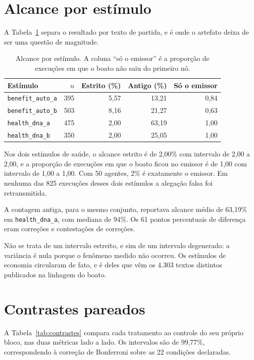 \section{Alcance por estímulo}

A Tabela~\ref{tab:estimulos} separa o resultado por texto de partida, e é onde
o artefato deixa de ser uma questão de magnitude.

\begin{table}[htbp]
\centering
\caption{Alcance por estímulo. A coluna ``só o emissor'' é a proporção de
execuções em que o boato não saiu do primeiro nó.}
\label{tab:estimulos}
\begin{tabular}{lrrrr}
\toprule
Estímulo & $n$ & Estrito (\%) & Antigo (\%) & Só o emissor \\
\midrule
\texttt{benefit\_auto\_a} & 395 & 5,57 & 13,21 & 0,84 \\
\texttt{benefit\_auto\_b} & 503 & 8,16 & 21,27 & 0,63 \\
\texttt{health\_dna\_a}   & 475 & 2,00 & 63,19 & 1,00 \\
\texttt{health\_dna\_b}   & 350 & 2,00 & 25,05 & 1,00 \\
\bottomrule
\end{tabular}
\end{table}

Nos dois estímulos de saúde, o alcance estrito é de 2,00\% com intervalo de
2,00 a 2,00, e a proporção de execuções em que o boato ficou no emissor é de
1,00 com intervalo de 1,00 a 1,00. Com 50 agentes, 2\% é exatamente o emissor.
Em nenhuma das 825 execuções desses dois estímulos a alegação falsa foi
retransmitida.

A contagem antiga, para o mesmo conjunto, reportava alcance médio de 63,19\% em
\texttt{health\_dna\_a}, com mediana de 94\%. Os 61 pontos percentuais de
diferença eram correções e contestações de correções.

Não se trata de um intervalo estreito, e sim de um intervalo degenerado: a
variância é nula porque o fenômeno medido não ocorreu. Os estímulos de economia
circularam de fato, e é deles que vêm os 4.303 textos distintos publicados na
linhagem do boato.

\section{Contrastes pareados}

A Tabela~\ref{tab:contrastes} compara cada tratamento ao controle do seu
próprio bloco, nas duas métricas lado a lado. Os intervalos são de 99,77\%,
correspondendo à correção de Bonferroni sobre as 22 condições declaradas.

